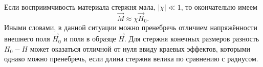 Если восприимчивость материала стержня мала, $|\chi|\ll 1$, то окончательно
имеем
\begin{equation*}
\vec M \approx \chi \vec{H}_0.
\end{equation*}
Иными словами, в данной ситуации можно пренебречь отличием напряжённости
внешнего поля $\vec H_0$ и поля в образце $\vec H$. Для стержня конечных
размеров разность $H_0 -H$ может оказаться отличной от нуля ввиду краевых
эффектов, которыми однако можно пренебречь, если длина стержня велика по сравнению
с радиусом.



%
%
%



